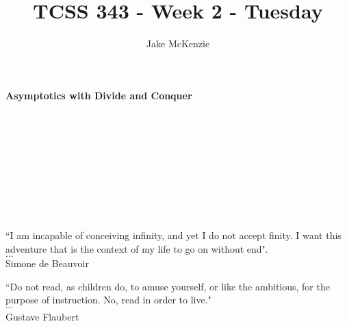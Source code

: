 \documentclass[12pt]{article}
\begin{document}
\title{TCSS 343 - Week 2 - Tuesday}
\author{Jake McKenzie}
\maketitle
\noindent\centerline{\textbf{Asymptotics with Divide and Conquer}}\\\\\\\\\\\\\\\\
\begin{center}
    ``I am incapable of conceiving infinity, and yet I do not accept finity. I want this adventure that is the context of my life to go on without end". \\$\dots$\\ Simone de Beauvoir
\end{center}
\begin{center}
    ``Do not read, as children do, to amuse yourself, or like the ambitious, for the purpose of instruction. No, read in order to live."\\
    $\cdots$\\
    Gustave Flaubert
\end{center}
\newpage
\end{document}

